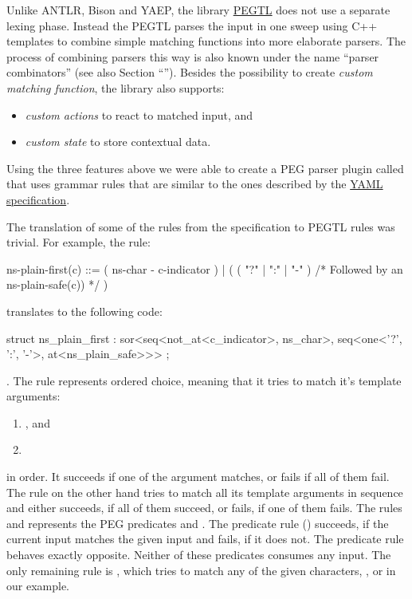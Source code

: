Unlike \gls{ANTLR}, Bison and YAEP, the library \href{https://github.com/taocpp/PEGTL}{PEGTL} does not use a separate lexing phase. Instead the \gls{PEGTL} parses the input in one sweep using C++ templates to combine simple matching functions into more elaborate parsers. The process of combining parsers this way is also known under the name “parser combinators” (see also Section “”). Besides the possibility to create \emph{custom matching function}, the library also supports:

\begin{itemize}
  \item \emph{custom actions} to react to matched input, and
  \item \emph{custom state} to store contextual data.
\end{itemize}

Using the three features above we were able to create a \gls{PEG} parser plugin called \LinkYAyPEG{} that uses grammar rules that are similar to the ones described by the \href{http://yaml.org/spec/1.2/spec}{YAML specification}.

The translation of some of the rules from the  specification to \gls{PEGTL} rules was trivial. For example, the rule:

\begin{ccode}
ns-plain-first(c) ::= ( ns-char - c-indicator )
                    | ( ( "?" | ":" | "-" )
                        /* Followed by an ns-plain-safe(c)) */ )
\end{ccode}

translates to the following code:

\begin{cppcode}
struct ns_plain_first : sor<seq<not_at<c_indicator>, ns_char>,
                            seq<one<'?', ':', '-'>,
                                at<ns_plain_safe>>> {};
\end{cppcode}

. The rule  represents ordered choice, meaning that it tries to match it’s template arguments:

\begin{enumerate}
  \item {}, and
  \item {}
\end{enumerate}

in order. It succeeds if one of the argument matches, or fails if all of them fail. The rule  on the other hand tries to match all its template arguments in sequence and either succeeds, if all of them succeed, or fails, if one of them fails. The rules  and  represents the \gls{PEG} predicates \cc{&} and \cc{!}. The predicate rule  (\cc{&}) succeeds, if the current input matches the given input and fails, if it does not. The predicate rule  behaves exactly opposite. Neither of these predicates consumes any input. The only remaining rule is , which tries to match any of the given characters, ,  or  in our example.

